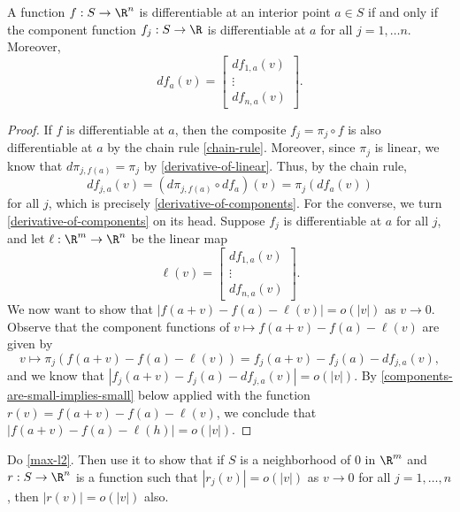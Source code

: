 \begin{lemma} \label{differentiable-by-components}
	A function $f : S \to \R^n$ is differentiable at an interior point $a \in S$ if and only if the component function $f_j : S \to \R$ is differentiable at $a$ for all $j = 1, \dotsc n$. Moreover,
	\begin{equation} \label{derivative-of-components} df_a(v) = \begin{bmatrix} df_{1,a}(v) \\ \vdots \\ df_{n,a}(v) \end{bmatrix}. \end{equation}
\end{lemma}

\begin{proof}
	If $f$ is differentiable at $a$, then the composite $f_j = \pi_j \circ f$ is also differentiable at $a$ by the chain rule \ref{chain-rule}. Moreover, since $\pi_j$ is linear, we know that $d\pi_{j,f(a)} = \pi_j$ by \cref{derivative-of-linear}. Thus, by the chain rule, 
	\[ df_{j,a}(v) = (d\pi_{j,f(a)} \circ df_a)(v) = \pi_j(df_a(v)) \]
	for all $j$, which is precisely \cref{derivative-of-components}. 
	For the converse, we turn \cref{derivative-of-components} on its head. Suppose $f_j$ is differentiable at $a$ for all $j$, and let $\ell : \R^m \to \R^n$ be the linear map 
	\[ \ell(v) = \begin{bmatrix} df_{1,a}(v) \\ \vdots \\ df_{n,a}(v) \end{bmatrix}.  \]
	We now want to show that $|f(a+v)-f(a)-\ell(v)| = o(|v|)$ as $v \to 0$. Observe that the component functions of $v \mapsto f(a+v)-f(a)-\ell(v)$ are given by
	\[ v \mapsto \pi_j \left( f(a+v)-f(a)-\ell(v) \right) = f_j(a+v)-f_j(a)-df_{j,a}(v), \]
	and we know that $|f_j(a+v)-f_j(a)-df_{j,a}(v)| = o(|v|)$. By \cref{components-are-small-implies-small} below applied with the function $r(v) = f(a+v)-f(a)-\ell(v)$, we conclude that $|f(a+v)-f(a)-\ell(h)| = o(|v|)$. 
\end{proof}

\begin{exercise} \label{components-are-small-implies-small}
	Do \cref{max-l2}. Then use it to show that if $S$ is a neighborhood of 0 in $\R^m$ and $r :  S  \to \R^n$ is a function such that $|r_j(v)| = o(|v|)$ as $v \to 0$ for all $j = 1, \dotsc, n$, then $|r(v)| = o(|v|)$ also.
\end{exercise}

